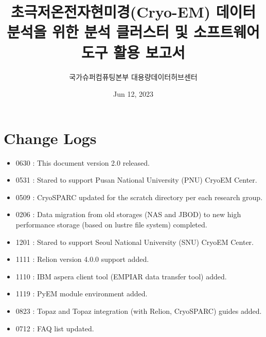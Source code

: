 \documentclass[a4paper,11pt,english]{sphinxmanual}
\title{초극저온전자현미경(Cryo-EM) 데이터 분석을 위한 분석 클러스터 및 소프트웨어 도구 활용 보고서}
\date{Jun 12, 2023}
\author{국가슈퍼컴퓨팅본부 대용량데이터허브센터}
\begin{document}
\pagestyle{empty}
\sphinxmaketitle
\pagestyle{plain}
\sphinxtableofcontents
\pagestyle{normal}
\label{\detokenize{index::doc}}


\sphinxstepscope


\chapter{Change Logs}
\label{\detokenize{changelog:change-logs}}\label{\detokenize{changelog::doc}}\begin{itemize}
\item {} 
\sphinxhyphen{}06\sphinxhyphen{}30 : This document version 2.0 released.

\item {} 
\sphinxhyphen{}05\sphinxhyphen{}31 : Stared to support Pusan National University (PNU) Cryo\sphinxhyphen{}EM Center.

\item {} 
\sphinxhyphen{}05\sphinxhyphen{}09 : CryoSPARC updated for the scratch directory per each research group.

\item {} 
\sphinxhyphen{}02\sphinxhyphen{}06 : Data migration from old storages (NAS and JBOD) to new high performance storage (based on lustre file system) completed.

\item {} 
\sphinxhyphen{}12\sphinxhyphen{}01 : Stared to support Seoul National University (SNU) Cryo\sphinxhyphen{}EM Center.

\item {} 
\sphinxhyphen{}11\sphinxhyphen{}11 : Relion version 4.0.0 support added.

\item {} 
\sphinxhyphen{}11\sphinxhyphen{}10 : IBM aspera client tool (EMPIAR data transfer tool) added.

\item {} 
\sphinxhyphen{}11\sphinxhyphen{}19 : PyEM module environment added.

\item {} 
\sphinxhyphen{}08\sphinxhyphen{}23 : Topaz and Topaz integration (with Relion, CryoSPARC) guides added.

\item {} 
\sphinxhyphen{}07\sphinxhyphen{}12 : FAQ list updated.


\end{itemize}
\end{document}
